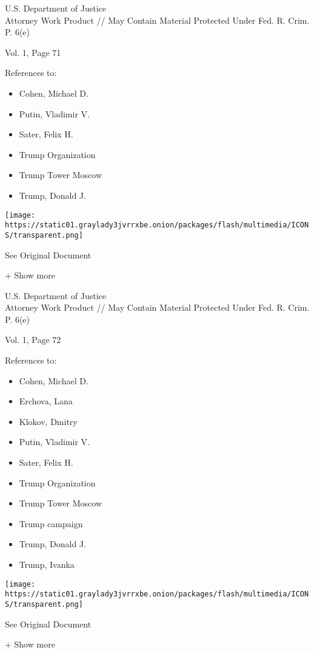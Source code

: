 U.S. Department of Justice\\
Attorney Work Product // May Contain Material Protected Under Fed. R.
Crim. P. 6(e)

Vol. 1, Page 71

References to:

\begin{itemize}
\tightlist
\item
  Cohen, Michael D.
\item
  Putin, Vladimir V.
\item
  Sater, Felix H.
\item
  Trump Organization
\item
  Trump Tower Moscow
\item
  Trump, Donald J.
\end{itemize}

\protect\hyperlink{}{}

\texttt{[image: https://static01.graylady3jvrrxbe.onion/packages/flash/multimedia/ICONS/transparent.png]}

See Original Document

+ Show more

U.S. Department of Justice\\
Attorney Work Product // May Contain Material Protected Under Fed. R.
Crim. P. 6(e)

Vol. 1, Page 72

References to:

\begin{itemize}
\tightlist
\item
  Cohen, Michael D.
\item
  Erchova, Lana
\item
  Klokov, Dmitry
\item
  Putin, Vladimir V.
\item
  Sater, Felix H.
\item
  Trump Organization
\item
  Trump Tower Moscow
\item
  Trump campaign
\item
  Trump, Donald J.
\item
  Trump, Ivanka
\end{itemize}

\protect\hyperlink{}{}

\texttt{[image: https://static01.graylady3jvrrxbe.onion/packages/flash/multimedia/ICONS/transparent.png]}

See Original Document

+ Show more

